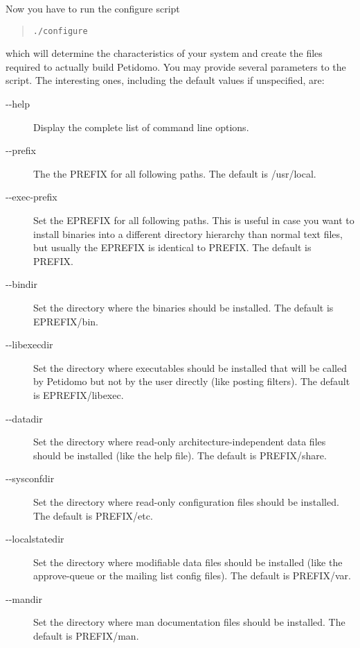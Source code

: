 \documentclass[a4paper,10pt]{scrreprt}
\newcommand{\file}[1]{{\sf #1}}
\begin{document}
Now you have to run the configure script
\begin{quote}
\begin{verbatim}
./configure
\end{verbatim}
\end{quote}
which will determine the characteristics of your system and create the
files required to actually build Petidomo. You may provide several
parameters to the script. The interesting ones, including the default
values if unspecified, are:
\begin{description}

\item[{-}{-}help] Display the complete list of command line options.

\item[{-}{-}prefix] The the \file{PREFIX} for all following paths. The
default is \file{/usr/local}.

\item[{-}{-}exec-prefix] Set the \file{EPREFIX} for all following
paths. This is useful in case you want to install binaries into a
different directory hierarchy than normal text files, but usually the
\file{EPREFIX} is identical to \file{PREFIX}. The default is
\file{PREFIX}.

\item[{-}{-}bindir] Set the directory where the binaries should be
installed. The default is \file{EPREFIX/bin}.

\item[{-}{-}libexecdir] Set the directory where executables should be
installed that will be called by Petidomo but not by the user directly
(like posting filters). The default is \file{EPREFIX/libexec}.

\item[{-}{-}datadir] Set the directory where read-only
architecture-independent data files should be installed (like the help
file). The default is \file{PREFIX/share}.

\item[{-}{-}sysconfdir] Set the directory where read-only
configuration files should be installed. The default is
\file{PREFIX/etc}.

\item[{-}{-}localstatedir] Set the directory where modifiable
data files should be installed (like the approve-queue or the mailing
list config files). The default is \file{PREFIX/var}.

\item[{-}{-}mandir] Set the directory where man documentation files
should be installed. The default is \file{PREFIX/man}.

\end{description}
\end{document}
